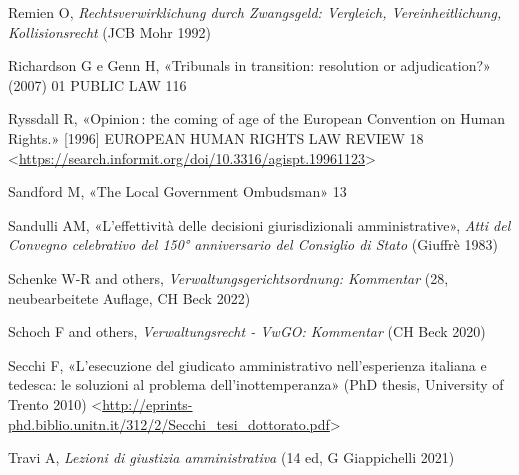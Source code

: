 \documentclass[12pt,it,a4paper,]{report}
\newlength{\cslhangindent}
\newenvironment{CSLReferences}[2] %
 {%
  \setlength{\parindent}{0pt}
  \ifodd #1 \everypar{\setlength{\hangindent}{\cslhangindent}}\ignorespaces\fi
  \ifnum #2 > 0
  \setlength{\parskip}{#2\baselineskip}
  \fi
 }%
 {}
\begin{document}
\begin{CSLReferences}{0}{0}
\leavevmode{}%
Remien O, \emph{Rechtsverwirklichung durch Zwangsgeld: Vergleich,
Vereinheitlichung, Kollisionsrecht} (JCB Mohr 1992)

\leavevmode{}%
Richardson G e Genn H, {«Tribunals in transition: resolution or
adjudication?»} (2007) 01 PUBLIC LAW 116

\leavevmode{}%
Ryssdall R, {«Opinion\,: the coming of age of the European Convention on
Human Rights.»} {[}1996{]} EUROPEAN HUMAN RIGHTS LAW REVIEW 18
\textless{}\url{https://search.informit.org/doi/10.3316/agispt.19961123}\textgreater{}

\leavevmode{}%
Sandford M, {«The Local Government Ombudsman»} 13

\leavevmode{}%
Sandulli AM, {«L'effettività delle decisioni giurisdizionali
amministrative»}, \emph{Atti del Convegno celebrativo del 150°
anniversario del Consiglio di Stato} (Giuffrè 1983)

\leavevmode{}%
Schenke W-R and others, \emph{Verwaltungsgerichtsordnung: Kommentar}
(28, neubearbeitete Auflage, CH Beck 2022)

\leavevmode{}%
Schoch F and others, \emph{Verwaltungsrecht - VwGO: Kommentar} (CH Beck
2020)

\leavevmode{}%
Secchi F, {«L'esecuzione del giudicato amministrativo nell'esperienza
italiana e tedesca: le soluzioni al problema dell'inottemperanza»} (PhD
thesis, University of Trento 2010)
\textless{}\url{http://eprints-phd.biblio.unitn.it/312/2/Secchi_tesi_dottorato.pdf}\textgreater{}

\leavevmode{}%
Travi A, \emph{Lezioni di giustizia amministrativa} (14 ed, G
Giappichelli 2021)

\end{CSLReferences}
\end{document}
